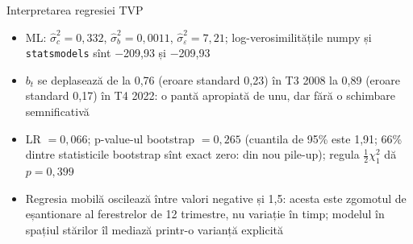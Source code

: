 \begin{frame}{Interpretarea regresiei TVP}
\itemsize{\small}
\begin{itemize}
    \item ML: $\hat\sigma^2_c = 0{,}332$, $\hat\sigma^2_b = 0{,}0011$, $\hat\sigma^2_\varepsilon = 7{,}21$; log-verosimilitățile numpy și \texttt{statsmodels} sînt \ensuremath{-}209{,}93 și \ensuremath{-}209{,}93
    \item $b_t$ se deplasează de la 0{,}76 (eroare standard 0{,}23) în T3 2008 la 0{,}89 (eroare standard 0{,}17) în T4 2022: o pantă apropiată de unu, dar fără o schimbare semnificativă
    \item LR $= 0{,}066$; p-value-ul bootstrap $= 0{,}265$ (cuantila de 95\% este 1{,}91; 66\% dintre statisticile bootstrap sînt exact zero: din nou pile-up); regula $\frac12\chi^2_1$ dă $p = 0{,}399$
    \item Regresia mobilă oscilează între valori negative și 1,5: acesta este zgomotul de eșantionare al ferestrelor de 12 trimestre, nu variație în timp; modelul în spațiul stărilor îl mediază printr-o varianță explicită
\end{itemize}
\end{frame}

